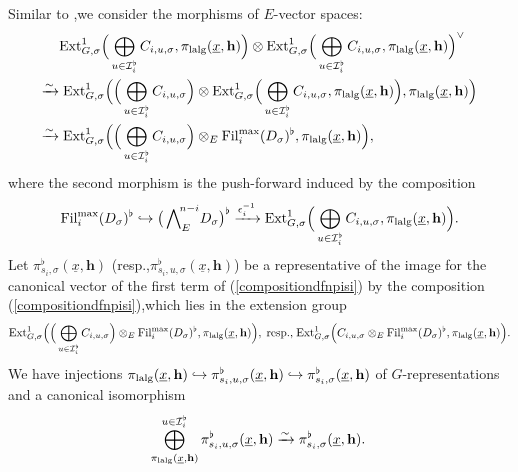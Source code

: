 \documentclass[10pt]{article}
\newcommand{\fil}{{\rm Fil}}
\newcommand{\ext}{{\rm Ext}}
\newcommand{\lalg}{{\rm lalg}}
\newcommand{\bh}{{\mathbf{h}}}
\newcommand{\cI}{\mathcal I}
\begin{document}
Similar to \cite[(46)]{BDcritical25},\;we consider the morphisms of $E$-vector spaces:
\begin{equation}\label{compositiondfnpisi}
	\begin{aligned}
		&\ext^1_{G,\sigma}\Big(\bigoplus_{u\in \cI_{i}^{\flat}}C_{i,u,\sigma},\pi_{\lalg}(\underline{x},\bh)\Big)\otimes \ext^1_{G,\sigma}\Big(\bigoplus_{u\in \cI_{i}^{\flat}}C_{i,u,\sigma},\pi_{\lalg}(\underline{x},\bh)\Big)^{\vee}\\
		\xrightarrow{\sim}&\;\ext^1_{G,\sigma}\Big(\Big(\bigoplus_{u\in \cI_{i}^{\flat}}C_{i,u,\sigma}\Big)\otimes\ext^1_{G,\sigma}\Big(\bigoplus_{u\in \cI_{i}^{\flat}}C_{i,u,\sigma},\pi_{\lalg}(\underline{x},\bh)\Big) ,\pi_{\lalg}(\underline{x},\bh)\Big)\\
		\xrightarrow{\sim}&\;\ext^1_{G,\sigma}\Big(\Big(\bigoplus_{u\in \cI_{i}^{\flat}}C_{i,u,\sigma}\Big)\otimes_E\fil_i^{\max}(D_{\sigma})^{\flat},\pi_{\lalg}(\underline{x},\bh)\Big),
	\end{aligned}
\end{equation}
where the second morphism is the push-forward induced by the composition
\[\fil_i^{\max}(D_{\sigma})^{\flat}\hookrightarrow \big(\bigwedge\nolimits_{E}^{\!n-i}\!D_{\sigma}\big)^{\flat}\xrightarrow{\epsilon_i^{-1}}\ext^1_{G,\sigma}\Big(\bigoplus_{u\in \cI_{i}^{\flat}}C_{i,u,\sigma},\pi_{\lalg}(\underline{x},\bh)\Big).\] 
Let $\pi^{\flat}_{s_i,\sigma}(\underline{x},\bh)$ (resp.,\;$\pi^{\flat}_{s_i,u,\sigma}(\underline{x},\bh)$) be a representative of the image for the canonical vector of the first term of (\ref{compositiondfnpisi}) by the composition (\ref{compositiondfnpisi}),\;which lies in the extension group 
\[\ext^1_{G,\sigma}\Big(\Big(\bigoplus_{u\in \cI_{i}^{\flat}}C_{i,u,\sigma}\Big)\otimes_E\fil_i^{\max}(D_{\sigma})^{\flat},\pi_{\lalg}(\underline{x},\bh)\Big),\;\text{resp.,\;}\ext^1_{G,\sigma}\Big(C_{i,u,\sigma}\otimes_E\fil_i^{\max}(D_{\sigma})^{\flat},\pi_{\lalg}(\underline{x},\bh)\Big).\]
We have injections $\pi_{\lalg}(\underline{x},\bh)\hookrightarrow \pi^{\flat}_{s_i,u,\sigma}(\underline{x},\bh) \hookrightarrow \pi^{\flat}_{s_i,\sigma}(\underline{x},\bh)$ of $G$-representations and a canonical isomorphism
\[\bigoplus^{u\in \cI_{i}^{\flat}}_{\pi_{\lalg}(\underline{x},\bh)}\pi^{\flat}_{s_i,u,\sigma}(\underline{x},\bh)\xrightarrow{\sim }\pi^{\flat}_{s_i,\sigma}(\underline{x},\bh).\;\]
\end{document}

